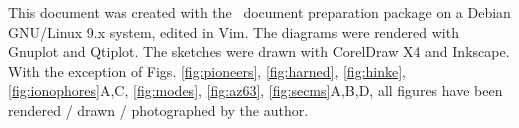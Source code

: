 \newpage
This document was created with the \LaTeXe \, document preparation package on a Debian GNU/Linux 9.x system, edited in Vim.
The diagrams were rendered with Gnuplot and Qtiplot.
The sketches were drawn with CorelDraw X4 and Inkscape.
With the exception of Figs. \ref{fig:pioneers}, \ref{fig:harned}, \ref{fig:hinke}, \ref{fig:ionophores}A,C, \ref{fig:modes}, \ref{fig:az63}, \ref{fig:secms}A,B,D, all figures have been rendered / drawn / photographed by the author.
